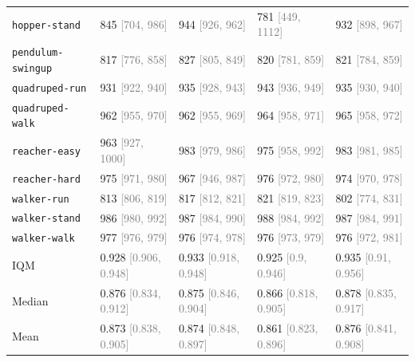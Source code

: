 \begin{tabular}{lllll}
\texttt{hopper-stand} & 845 \textcolor{gray}{[704, 986]} & 944 \textcolor{gray}{[926, 962]} & 781 \textcolor{gray}{[449, 1112]} & 932 \textcolor{gray}{[898, 967]} \\
\texttt{pendulum-swingup} & 817 \textcolor{gray}{[776, 858]} & 827 \textcolor{gray}{[805, 849]} & 820 \textcolor{gray}{[781, 859]} & 821 \textcolor{gray}{[784, 859]} \\
\texttt{quadruped-run} & 931 \textcolor{gray}{[922, 940]} & 935 \textcolor{gray}{[928, 943]} & 943 \textcolor{gray}{[936, 949]} & 935 \textcolor{gray}{[930, 940]} \\
\texttt{quadruped-walk} & 962 \textcolor{gray}{[955, 970]} & 962 \textcolor{gray}{[955, 969]} & 964 \textcolor{gray}{[958, 971]} & 965 \textcolor{gray}{[958, 972]} \\
\texttt{reacher-easy} & 963 \textcolor{gray}{[927, 1000]} & 983 \textcolor{gray}{[979, 986]} & 975 \textcolor{gray}{[958, 992]} & 983 \textcolor{gray}{[981, 985]} \\
\texttt{reacher-hard} & 975 \textcolor{gray}{[971, 980]} & 967 \textcolor{gray}{[946, 987]} & 976 \textcolor{gray}{[972, 980]} & 974 \textcolor{gray}{[970, 978]} \\
\texttt{walker-run} & 813 \textcolor{gray}{[806, 819]} & 817 \textcolor{gray}{[812, 821]} & 821 \textcolor{gray}{[819, 823]} & 802 \textcolor{gray}{[774, 831]} \\
\texttt{walker-stand} & 986 \textcolor{gray}{[980, 992]} & 987 \textcolor{gray}{[984, 990]} & 988 \textcolor{gray}{[984, 992]} & 987 \textcolor{gray}{[984, 991]} \\
\texttt{walker-walk} & 977 \textcolor{gray}{[976, 979]} & 976 \textcolor{gray}{[974, 978]} & 976 \textcolor{gray}{[973, 979]} & 976 \textcolor{gray}{[972, 981]} \\
IQM & 0.928 \textcolor{gray}{[0.906, 0.948]} & 0.933 \textcolor{gray}{[0.918, 0.948]} & 0.925 \textcolor{gray}{[0.9, 0.946]} & 0.935 \textcolor{gray}{[0.91, 0.956]} \\
Median & 0.876 \textcolor{gray}{[0.834, 0.912]} & 0.875 \textcolor{gray}{[0.846, 0.904]} & 0.866 \textcolor{gray}{[0.818, 0.905]} & 0.878 \textcolor{gray}{[0.835, 0.917]} \\
Mean & 0.873 \textcolor{gray}{[0.838, 0.905]} & 0.874 \textcolor{gray}{[0.848, 0.897]} & 0.861 \textcolor{gray}{[0.823, 0.896]} & 0.876 \textcolor{gray}{[0.841, 0.908]} \\
\bottomrule
\end{tabular}
